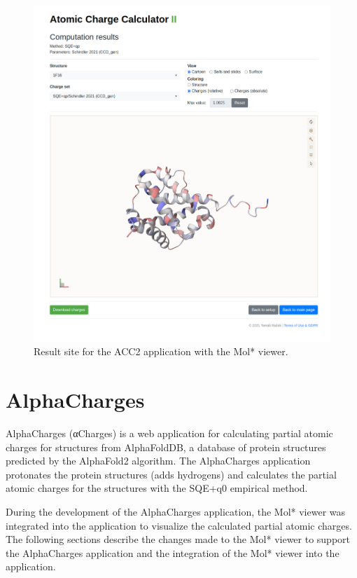 \documentclass[
  digital,     %
  oneside,     %
  nosansbold,  %
  nocolorbold, %
  lof,         %
  lot,         %
]{fithesis4}
\begin{document}
\begin{figure}[htbp]
  \begin{center}
    \includegraphics[width=\textwidth]{figures/results-full.png}
  \end{center}
  \caption{Result site for the ACC2 application with the Mol* viewer.}
  \label{fig:result_site}
\end{figure}

\chapter{AlphaCharges}

AlphaCharges (αCharges) is a web application for calculating partial atomic charges for structures from AlphaFoldDB, a database of protein structures predicted by the AlphaFold2 algorithm. \parencite{jumper2021alphafold} The AlphaCharges application protonates the protein structures (adds hydrogens) and calculates the partial atomic charges for the structures with the SQE+q0 empirical method. \parencite{schindler2023alphacharges, schindler2021sqe}

During the development of the AlphaCharges application, the Mol* viewer was integrated into the application to visualize the calculated partial atomic charges. The following sections describe the changes made to the Mol* viewer to support the AlphaCharges application and the integration of the Mol* viewer into the application.
\end{document}
